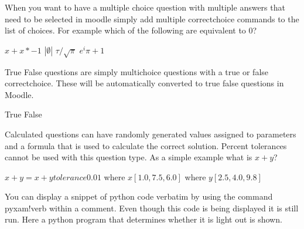 \documentclass[12pt]{exam}
\begin{document}
\begin{questions}
                When you want to have a multiple choice question with multiple answers that need to be selected in moodle
                simply add multiple correctchoice commands to the list of choices. For example which of the following
                are equivalent to 0?
                \begin{choices}
                    \CorrectChoice $x + x*-1$
                    \CorrectChoice $|\emptyset|$
                    \choice $\tau / \sqrt{\pi}$
                    \CorrectChoice $e^i\pi + 1$
                \end{choices}

                True False questions are simply multichoice questions with a true or false correctchoice. These will be
                automatically converted to true false questions in Moodle.
                \begin{choices}
                    \CorrectChoice True
                    \choice False
                \end{choices}

                Calculated questions can have randomly generated values assigned to parameters and a formula that is used
                to calculate the correct solution. Percent tolerances cannot be used with this question type. As a simple
                example what is ${x} + {y}$?
                \begin{solution}
                    ${x} + {y} = {x} + {y} tolerance 0.01$
                    where ${x} [1.0, 7.5, 6.0]$
                    where ${y} [2.5, 4.0, 9.8]$
                \end{solution}

                You can display a snippet of python code verbatim by using the command pyxam!verb within a comment. Even
                though this code is being displayed it is still run. Here a python program that determines whether it is
                light out is shown.
                \begin{comment}
                    pyxam!verb

from time import localtime
# Is it dark outside?
dark = {
    1:16,2:17,3:18,4:19,5:19,6:20,7:20,8:19,9:18,10:17,11:16,12:16
}

light = {
    1:8,2:7,3:6,4:5,5:4,6:4,7:4,8:5,9:6,10:6,11:7,12:8
}
if localtime().tm_hour >=dark[localtime().tm_mon] or localtime().tm_hour < light[localtime().tm_mon]:
    answer = 'Yes'
else:
    answer = 'No'


\end{comment}
\end{questions}
\end{document}
